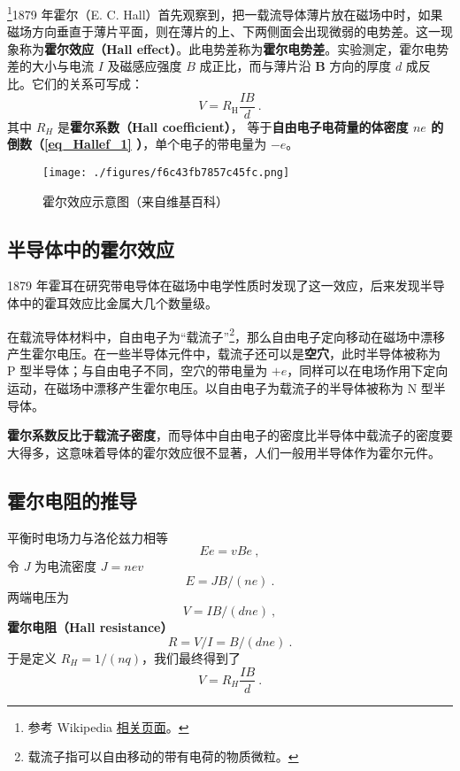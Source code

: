 

\footnote{参考 Wikipedia \href{https://en.wikipedia.org/wiki/Hall_effect}{相关页面}。}1879 年霍尔（E. C. Hall）首先观察到，把一载流导体薄片放在磁场中时，如果磁场方向垂直于薄片平面，则在薄片的上、下两侧面会出现微弱的电势差。这一现象称为\textbf{霍尔效应（Hall effect）}。此电势差称为\textbf{霍尔电势差}。实验测定，霍尔电势差的大小与电流 $I$ 及磁感应强度 $B$ 成正比，而与薄片沿 $\mathbf B$ 方向的厚度 $d$ 成反比。它们的关系可写成：
\begin{equation}
V = R_{\mathrm{H}} \frac{I B}{d}~.
\end{equation}
其中 $R_H$ 是\textbf{霍尔系数（Hall coefficient）}， 等于\textbf{自由电子电荷量的体密度 $ne$ 的倒数（\autoref{eq_Hallef_1} ）}，单个电子的带电量为 $-e$。

\begin{figure}[ht]
\centering
\texttt{[image: ./figures/f6c43fb7857c45fc.png]}
\caption{霍尔效应示意图（来自维基百科）} \label{fig_Hallef_1}
\end{figure}
\subsection{半导体中的霍尔效应}
1879 年霍耳在研究带电导体在磁场中电学性质时发现了这一效应，后来发现半导体中的霍耳效应比金属大几个数量级。

在载流导体材料中，自由电子为“载流子”\footnote{载流子指可以自由移动的带有电荷的物质微粒。}，那么自由电子定向移动在磁场中漂移产生霍尔电压。在一些半导体元件中，载流子还可以是\textbf{空穴}，此时半导体被称为 P 型半导体；与自由电子不同，空穴的带电量为 $+e$，同样可以在电场作用下定向运动，在磁场中漂移产生霍尔电压。以自由电子为载流子的半导体被称为 N 型半导体。

\textbf{霍尔系数反比于载流子密度}，而导体中自由电子的密度比半导体中载流子的密度要大得多，这意味着导体的霍尔效应很不显著，人们一般用半导体作为霍尔元件。

\subsection{霍尔电阻的推导}
平衡时电场力与洛伦兹力相等
\begin{equation}
Ee = vBe~,
\end{equation}
令 $J$ 为电流密度 $J=nev$
\begin{equation}
E = JB/(ne)~.
\end{equation}
两端电压为
\begin{equation}\label{eq_Hallef_1}
V = IB/(d n e)~,
\end{equation}
\textbf{霍尔电阻（Hall resistance）}
\begin{equation}\label{eq_Hallef_2}
R = V/I = B/(d n e)~.
\end{equation}
于是定义 $R_H=1/(nq)$，我们最终得到了
\begin{equation}
V=R_H\frac{IB}{d}~.
\end{equation}

